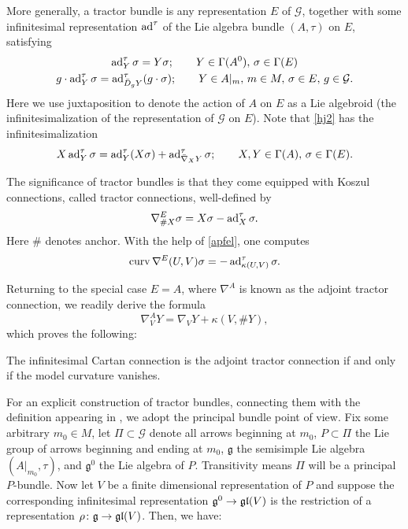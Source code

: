 \documentclass[leqno,12pt]{amsart} %
\begin{document}
More generally, a {\df tractor bundle} is any representation $E$ of ${\mathcal G}$,
together with some infinitesimal representation $\operatorname{ad}^\tau$ of the Lie algebra bundle
$(A, \tau)$ on $E$, satisfying
\begin{gather}
  \operatorname{ad}^\tau_Y\sigma  = Y \sigma;\qquad Y \in \Gamma(A^0),\, \sigma \in \Gamma(E)\label{hj1}\\
  g\cdot\operatorname{ad}^\tau_Y \sigma = \operatorname{ad}^\tau_{\bar D_gY}(g\cdot \sigma);
  \qquad Y \in A|_m,\,m \in M,\, \sigma \in E,\, g \in {\mathcal G}.\label{hj2}
\end{gather}
Here we use juxtaposition to denote the action of $A$ on $E$ as a Lie algebroid (the
infinitesimalization of the representation of ${\mathcal G}$ on $E$). Note that \eqref{hj2}
has the infinitesimalization
\begin{equation}
  \label{apfel}
  X\operatorname{ad}_Y^\tau \sigma = \operatorname{ad}_Y^\tau (X\sigma) + \operatorname{ad}^\tau_{\bar\nabla_XY}\sigma;
    \qquad X, Y \in \Gamma(A),\, \sigma \in \Gamma(E).
\end{equation}

The significance of tractor bundles is that they come equipped with Koszul
connections, called {\df tractor connections}, well-defined by
\begin{equation*}
  \nabla^E_{\#X} \sigma = X \sigma - \operatorname{ad}^\tau_X \sigma.
\end{equation*}
Here $\#$ denotes anchor. With the help of \eqref{apfel}, one computes
\begin{equation*}
  \operatorname{curv} \nabla^E(U, V) \sigma = -\operatorname{ad}^\tau_{\kappa(U, V)}\sigma.
\end{equation*}

Returning to the special case $E=A$, where $\nabla^A$ is known
as the {\df adjoint tractor connection}, we readily derive the formula
\begin{equation}
  \nabla^A_VY = \nabla_VY + \kappa(V, \#Y),\label{tractor1}
\end{equation}
which proves the following:
%
\begin{aside}
  The infinitesimal Cartan connection is the adjoint tractor connection if and only if the
  model curvature vanishes.
\end{aside}

For an explicit construction of tractor bundles, connecting them with the definition
appearing in \cite{Cap_Slovak_09}, we adopt the principal bundle point of view. Fix some
arbitrary $m_0 \in M$, let $\Pi \subset {\mathcal G} $ denote all arrows beginning at
$m_0$, $P \subset \Pi$ the Lie group of arrows beginning and ending at $m_0$,
${\mathfrak g} $ the semisimple Lie algebra $(A|_{m_0}, \tau)$, and ${\mathfrak g}^0$ the
Lie algebra of $P$. Transitivity means $\Pi $ will be a principal $P$-bundle. Now let $V$
be a finite dimensional representation of $P$ and suppose the corresponding infinitesimal
representation ${\mathfrak g}^0 \rightarrow \mathfrak{gl}(V)$ is the restriction of a representation
$\rho \colon {\mathfrak g} \rightarrow \mathfrak{gl}(V)$. Then, we have:
\end{document}
